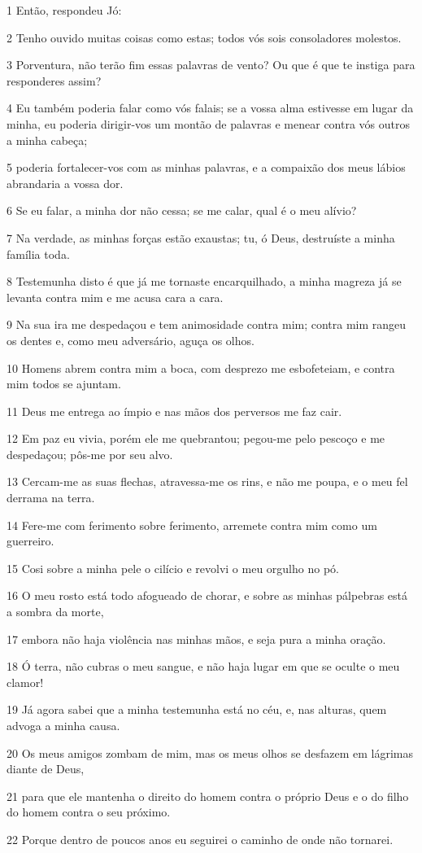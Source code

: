 \par 1 Então, respondeu Jó:
\par 2 Tenho ouvido muitas coisas como estas; todos vós sois consoladores molestos.
\par 3 Porventura, não terão fim essas palavras de vento? Ou que é que te instiga para responderes assim?
\par 4 Eu também poderia falar como vós falais; se a vossa alma estivesse em lugar da minha, eu poderia dirigir-vos um montão de palavras e menear contra vós outros a minha cabeça;
\par 5 poderia fortalecer-vos com as minhas palavras, e a compaixão dos meus lábios abrandaria a vossa dor.
\par 6 Se eu falar, a minha dor não cessa; se me calar, qual é o meu alívio?
\par 7 Na verdade, as minhas forças estão exaustas; tu, ó Deus, destruíste a minha família toda.
\par 8 Testemunha disto é que já me tornaste encarquilhado, a minha magreza já se levanta contra mim e me acusa cara a cara.
\par 9 Na sua ira me despedaçou e tem animosidade contra mim; contra mim rangeu os dentes e, como meu adversário, aguça os olhos.
\par 10 Homens abrem contra mim a boca, com desprezo me esbofeteiam, e contra mim todos se ajuntam.
\par 11 Deus me entrega ao ímpio e nas mãos dos perversos me faz cair.
\par 12 Em paz eu vivia, porém ele me quebrantou; pegou-me pelo pescoço e me despedaçou; pôs-me por seu alvo.
\par 13 Cercam-me as suas flechas, atravessa-me os rins, e não me poupa, e o meu fel derrama na terra.
\par 14 Fere-me com ferimento sobre ferimento, arremete contra mim como um guerreiro.
\par 15 Cosi sobre a minha pele o cilício e revolvi o meu orgulho no pó.
\par 16 O meu rosto está todo afogueado de chorar, e sobre as minhas pálpebras está a sombra da morte,
\par 17 embora não haja violência nas minhas mãos, e seja pura a minha oração.
\par 18 Ó terra, não cubras o meu sangue, e não haja lugar em que se oculte o meu clamor!
\par 19 Já agora sabei que a minha testemunha está no céu, e, nas alturas, quem advoga a minha causa.
\par 20 Os meus amigos zombam de mim, mas os meus olhos se desfazem em lágrimas diante de Deus,
\par 21 para que ele mantenha o direito do homem contra o próprio Deus e o do filho do homem contra o seu próximo.
\par 22 Porque dentro de poucos anos eu seguirei o caminho de onde não tornarei.

